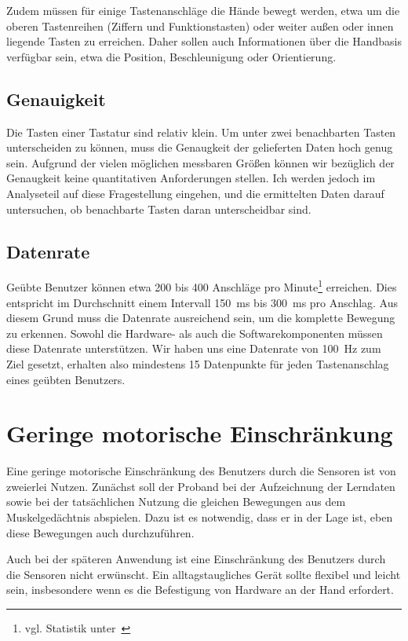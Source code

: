 Zudem müssen für einige Tastenanschläge die Hände bewegt werden, etwa um die
oberen Tastenreihen (Ziffern und Funktionstasten) oder weiter außen oder innen
liegende Tasten zu erreichen. Daher sollen auch Informationen über die
Handbasis verfügbar sein, etwa die Position, Beschleunigung oder Orientierung.

\subsection{Genauigkeit}

Die Tasten einer Tastatur sind relativ klein. Um unter zwei benachbarten Tasten
unterscheiden zu können, muss die Genaugkeit der gelieferten Daten hoch genug
sein. Aufgrund der vielen möglichen messbaren Größen können wir bezüglich der
Genaugkeit keine quantitativen Anforderungen stellen. Ich werden jedoch im
Analyseteil auf diese Fragestellung eingehen, und die ermittelten Daten darauf
untersuchen, ob benachbarte Tasten daran unterscheidbar sind.

\subsection{Datenrate}

Geübte Benutzer können etwa 200 bis 400 Anschläge pro Minute\footnote{vgl.
Statistik unter~\cite{typingspeed}} erreichen. Dies entspricht im Durchschnitt
einem Intervall \SI{150}{ms} bis \SI{300}{ms} pro Anschlag. Aus diesem Grund
muss die Datenrate ausreichend sein, um die komplette Bewegung zu erkennen.
Sowohl die Hardware- als auch die Softwarekomponenten müssen diese Datenrate
unterstützen. Wir haben uns eine Datenrate von \SI{100}{Hz} zum Ziel gesetzt,
erhalten also mindestens 15 Datenpunkte für jeden Tastenanschlag eines geübten
Benutzers.

\section{Geringe motorische Einschränkung}

Eine geringe motorische Einschränkung des Benutzers durch die Sensoren ist von
zweierlei Nutzen. Zunächst soll der Proband bei der Aufzeichnung der Lerndaten
sowie bei der tatsächlichen Nutzung die gleichen Bewegungen aus dem
Muskelgedächtnis abspielen. Dazu ist es notwendig, dass er in der Lage ist,
eben diese Bewegungen auch durchzuführen.

Auch bei der späteren Anwendung ist eine Einschränkung des Benutzers durch die
Sensoren nicht erwünscht. Ein alltagstaugliches Gerät sollte flexibel und leicht
sein, insbesondere wenn es die Befestigung von Hardware an der Hand erfordert.

